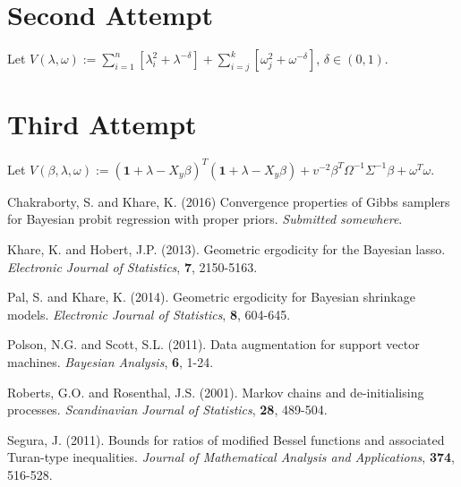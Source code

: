 \documentclass[12pt]{article}
\begin{document}
\newpage

\section{Second Attempt}

Let $V(\lambda, \omega) := \sum_{i=1}^{n}[\lambda_i^2 + \lambda^{-\delta}] + \sum_{i=j}^{k}[\omega_j^2 + \omega^{-\delta}]$, $\delta \in (0,1)$.

\section{Third Attempt}

Let $V(\beta, \lambda, \omega) := (\bm{1} + \lambda - X_{y}\beta)^T (\bm{1} + \lambda - X_{y}\beta) + v^{-2} \beta^T \Omega^{-1}\Sigma^{-1}\beta +
\omega^T \omega$.


\newpage

\begin{thebibliography}{9}
    Chakraborty, S. and Khare, K. (2016) Convergence properties of Gibbs samplers for Bayesian probit regression with proper priors.
    \emph{Submitted somewhere}.

    Khare, K. and Hobert, J.P. (2013). Geometric ergodicity for the Bayesian lasso. \emph{Electronic Journal of Statistics}, \textbf{7}, 2150-5163.

    Pal, S. and Khare, K. (2014). Geometric ergodicity for Bayesian shrinkage models. \emph{Electronic Journal of Statistics}, \textbf{8}, 604-645.

    Polson, N.G. and Scott, S.L. (2011). Data augmentation for support vector machines. \emph{Bayesian Analysis}, \textbf{6}, 1-24.

    Roberts, G.O. and Rosenthal, J.S. (2001). Markov chains and de-initialising processes. \emph{Scandinavian Journal of Statistics}, \textbf{28},
    489-504.

    Segura, J. (2011). Bounds for ratios of modified Bessel functions and associated Turan-type inequalities. \emph{Journal of Mathematical Analysis
    and Applications}, \textbf{374}, 516-528.
\end{thebibliography}
\end{document}
